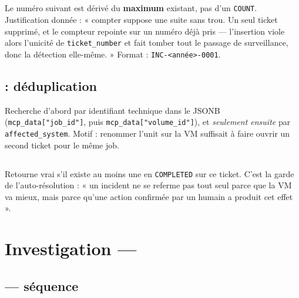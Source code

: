 \subsection*{}
Le numéro suivant est dérivé du \textbf{maximum} existant, pas d'un
\texttt{COUNT}. Justification donnée : « compter suppose une suite sans trou. Un
seul ticket supprimé, et le compteur repointe sur un numéro déjà pris ---
l'insertion viole alors l'unicité de \texttt{ticket\_number} et fait tomber tout
le passage de surveillance, donc la détection elle-même. » Format :
\texttt{INC-<année>-0001}.

\subsection*{ : déduplication}
Recherche d'abord par identifiant technique dans le JSONB
(\texttt{mcp\_data["job\_id"]}, puis \texttt{mcp\_data["volume\_id"]}), et
\emph{seulement ensuite} par \texttt{affected\_system}. Motif : renommer l'unit
sur la VM suffisait à faire ouvrir un second ticket pour le même job.

\subsection*{}
Retourne vrai s'il existe au moins une  en
\texttt{COMPLETED} sur ce ticket. C'est la garde de l'auto-résolution : « un
incident ne se referme pas tout seul parce que la VM va mieux, mais parce
qu'une action confirmée par un humain a produit cet effet ».

\section{Investigation --- }

\subsection*{ --- séquence}

